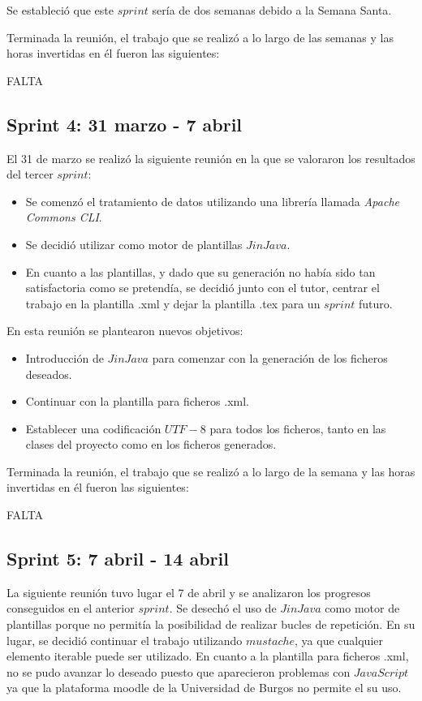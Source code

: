 Se estableció que este $sprint$ sería de dos semanas debido a la Semana Santa.

Terminada la reunión, el trabajo que se realizó a lo largo de las semanas y las horas invertidas en él fueron las siguientes:

FALTA 

\subsection{Sprint 4: 31 marzo - 7 abril}

El 31 de marzo se realizó la siguiente reunión en la que se valoraron los resultados del tercer $sprint$:
\begin{itemize}
\item Se comenzó el tratamiento de datos utilizando una librería llamada \textit{Apache Commons CLI}.
\item Se decidió utilizar como motor de plantillas $JinJava$. 
\item En cuanto a las plantillas, y dado que su generación no había sido tan satisfactoria como se pretendía, se decidió junto con el tutor, centrar el trabajo en la plantilla .xml y dejar la plantilla .tex para un $sprint$ futuro.
\end{itemize}

En esta reunión se plantearon nuevos objetivos:
\begin{itemize}
\item Introducción de $JinJava$ para comenzar con la generación de los ficheros deseados.
\item Continuar con la plantilla para ficheros .xml.
\item Establecer una codificación $UTF-8$ para todos los ficheros, tanto en las clases del proyecto como en los ficheros generados.
\end{itemize}

Terminada la reunión, el trabajo que se realizó a lo largo de la semana y las horas invertidas en él fueron las siguientes:

FALTA 

\subsection{Sprint 5: 7 abril - 14 abril}
La siguiente reunión tuvo lugar el 7 de abril y se analizaron los progresos conseguidos en el anterior $sprint$. Se desechó el uso de $JinJava$ como motor de plantillas porque no permitía la posibilidad de realizar bucles de repetición. En su lugar, se decidió continuar el trabajo utilizando $mustache$, ya que cualquier elemento iterable puede ser utilizado. En cuanto a la plantilla para ficheros .xml, no se pudo avanzar lo deseado puesto que aparecieron problemas con $JavaScript$ ya que la plataforma moodle de la Universidad de Burgos no permite el  su uso.

